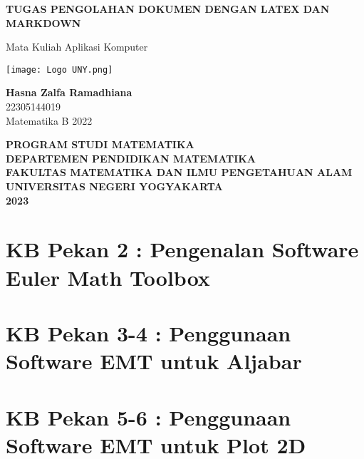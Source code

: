 \documentclass{report}
\begin{document}
\begin{titlepage}
    \begin{center}
        \vspace{0,2cm}

        \huge
        \textbf{TUGAS PENGOLAHAN DOKUMEN DENGAN LATEX DAN MARKDOWN}

        \vspace{1cm}

        \large
        Mata Kuliah Aplikasi Komputer

        \vspace{1cm}

        \texttt{[image: Logo UNY.png]}

        \vspace{1cm}

        \textbf{Hasna Zalfa Ramadhiana}\\
        22305144019\\
        Matematika B 2022

        \vspace{2cm}

        \Large
        \textbf{PROGRAM STUDI MATEMATIKA}\\
        \textbf{DEPARTEMEN PENDIDIKAN MATEMATIKA}\\
        \textbf{FAKULTAS MATEMATIKA DAN ILMU PENGETAHUAN ALAM}\\
        \textbf{UNIVERSITAS NEGERI YOGYAKARTA}\\
        \textbf{2023}
        
    \end{center}
\end{titlepage}

\newpage
\tableofcontents

\chapter{KB Pekan 2 : Pengenalan Software Euler Math Toolbox}


\newpage
\chapter{KB Pekan 3-4 : Penggunaan Software EMT untuk Aljabar}


\newpage
\chapter{KB Pekan 5-6 : Penggunaan Software EMT untuk Plot 2D}

\end{document}
